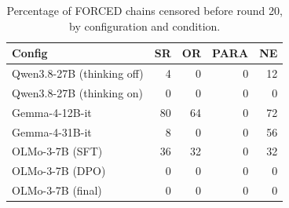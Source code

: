 \begin{table}[t]
\centering
\caption{Percentage of FORCED chains censored before round 20, by configuration and condition.}
\label{tab:censoring}
\begin{tabular}{lrrrr}
\toprule
Config & SR & OR & PARA & NE \\
\midrule
Qwen3.8-27B (thinking off) & 4 & 0 & 0 & 12 \\
Qwen3.8-27B (thinking on) & 0 & 0 & 0 & 0 \\
Gemma-4-12B-it & 80 & 64 & 0 & 72 \\
Gemma-4-31B-it & 8 & 0 & 0 & 56 \\
OLMo-3-7B (SFT) & 36 & 32 & 0 & 32 \\
OLMo-3-7B (DPO) & 0 & 0 & 0 & 0 \\
OLMo-3-7B (final) & 0 & 0 & 0 & 0 \\
\bottomrule
\end{tabular}
\end{table}
